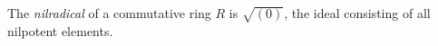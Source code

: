 
The \emph{nilradical} of a commutative ring $R$ is $\sqrt{(0)}$, the ideal consisting of all nilpotent elements.
